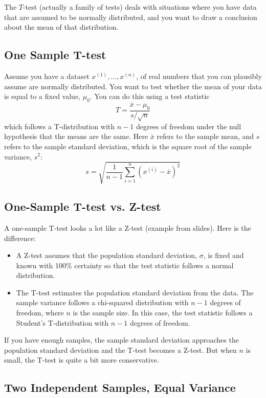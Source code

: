 The $T$-test (actually a family of tests) deals with situations where you have data that are assumed to be normally distributed, and you want to draw a conclusion about the mean of that distribution.

\subsection{One Sample T-test}

Assume you have a dataset $x^{(1)}, \dots, x^{(n)}$, of real numbers that you can plausibly assume are normally distributed. You want to test whether the mean of your data is equal to a fixed value, $\mu_0$. You can do this using a test statistic
$$ T = \frac{\overline{x} - \mu_0}{s/\sqrt{n}} $$
which follows a T-distribution with $n-1$ degrees of freedom under the null hypothesis that the means are the same. Here $\overline{x}$ refers to the sample mean, and $s$ refers to the sample standard deviation, which is the square root of the sample variance, $s^2$:
$$ s = \sqrt{\frac{1}{n-1} \sum_{i=1}^n (x^{(i)} - \overline{x})^2} $$

\subsection{One-Sample T-test vs. Z-test}

A one-sample T-test looks a lot like a Z-test (example from slides). Here is the difference:
\begin{itemize}
\item A Z-test assumes that the population standard deviation, $\sigma$, is fixed and known with 100\% certainty so that the test statistic follows a normal distribution.
\item The T-test estimates the population standard deviation from the data. The sample variance follows a chi-squared distribution with $n-1$ degrees of freedom, where $n$ is the sample size. In this case, the test statistic follows a Student's T-distribution with $n-1$ degrees of freedom.
\end{itemize}

If you have enough samples, the sample standard deviation approaches the population standard deviation and the T-test becomes a Z-test. But when $n$ is small, the T-test is quite a bit more conservative.

\subsection{Two Independent Samples, Equal Variance}

